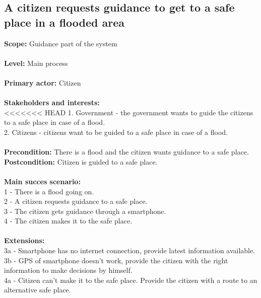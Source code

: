 \subsection{A citizen requests guidance to get to a safe place in a flooded area}
\textbf{Scope:} Guidance part of the system\\\\
\textbf{Level:} Main process\\\\
\textbf{Primary actor:} Citizen\\\\
\textbf{Stakeholders and interests:}\\
<<<<<<< HEAD
	1. Government - the government wants to guide the citizens to a safe place in case of a flood. \\
	2. Citizens - citizens want to be guided to a safe place in case of a flood. \\\\
\textbf{Precondition:} There is a flood and the citizen wants guidance to a safe place. \\
\textbf{Postcondition:} Citizen is guided to a safe place. \\\\
\textbf{Main succes scenario:} \\
1 - There is a flood going on.\\
2 - A citizen requests guidance to a safe place.\\
3 - The citizen gets guidance through a smartphone.\\
4 - The citizen makes it to the safe place.\\\\
\textbf{Extensions:} \\
3a - Smartphone has no internet connection, provide latest information available.\\
3b - GPS of smartphone doesn't work, provide the citizen with the right information to make decisions by himself.\\
4a - Citizen can't make it to the safe place. Provide the citizen with a route to an alternative safe place.

